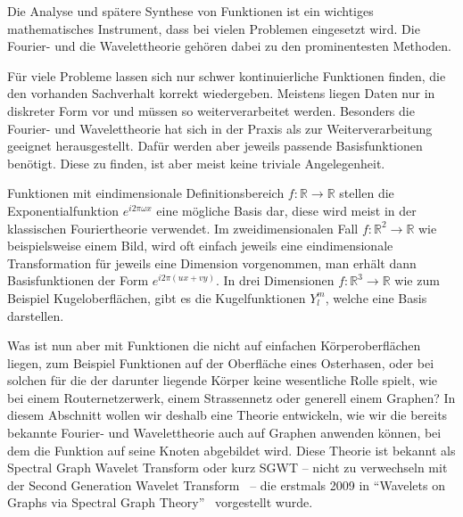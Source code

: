 
Die Analyse und sp\"atere Synthese von Funktionen ist ein wichtiges 
mathematisches Instrument, dass bei vielen Problemen eingesetzt wird. Die 
Fourier- und die Wavelettheorie geh\"oren dabei zu den prominentesten Methoden.

F\"ur viele Probleme lassen sich nur schwer kontinuierliche Funktionen finden, 
die den vorhanden Sachverhalt korrekt wiedergeben. Meistens liegen Daten 
nur in diskreter Form vor und m\"ussen so weiterverarbeitet werden. Besonders 
die Fourier- und Wavelettheorie hat sich in der Praxis als zur 
Weiterverarbeitung geeignet herausgestellt. Daf\"ur werden aber jeweils 
passende Basisfunktionen ben\"otigt. Diese zu finden, ist aber meist keine 
triviale Angelegenheit.

Funktionen mit eindimensionale Definitionsbereich $f: \mathbb{R} \rightarrow 
\mathbb{R}$ stellen 
die Exponentialfunktion $e^{i2\pi\omega x}$ eine m\"ogliche Basis dar, diese 
wird meist in der klassischen Fouriertheorie verwendet. Im 
zweidimensionalen Fall $f: \mathbb{R}^2 \rightarrow \mathbb{R}$ wie 
beispielsweise einem Bild, wird oft einfach jeweils eine eindimensionale 
Transformation f\"ur jeweils eine Dimension vorgenommen, man erh\"alt dann 
Basisfunktionen der Form $e^{i2\pi(ux+vy)}$. In drei Dimensionen $f: 
\mathbb{R}^3 \rightarrow \mathbb{R}$ wie zum Beispiel Kugeloberfl\"achen, gibt 
es die Kugelfunktionen $Y^m_l$, welche eine Basis darstellen.

Was ist nun aber mit Funktionen die nicht auf einfachen K\"orperoberfl\"achen 
liegen, zum Beispiel Funktionen auf der Oberfl\"ache eines Osterhasen, oder bei 
solchen f\"ur die der darunter liegende K\"orper keine wesentliche Rolle 
spielt, wie bei einem Routernetzerwerk, einem Strassennetz oder generell einem 
Graphen? In diesem Abschnitt wollen wir deshalb eine Theorie entwickeln, wie 
wir die bereits bekannte Fourier- und Wavelettheorie auch auf Graphen anwenden 
k\"onnen, bei dem die Funktion auf seine Knoten abgebildet wird. Diese Theorie 
ist bekannt als Spectral Graph Wavelet Transform oder kurz SGWT -- nicht zu 
verwechseln mit der Second Generation Wavelet 
Transform~\cite{noauthor_second-generation_2018} 
-- die erstmals 2009 in ``Wavelets on Graphs via Spectral Graph 
Theory''~\cite{hammond_wavelets_2009} vorgestellt wurde.
